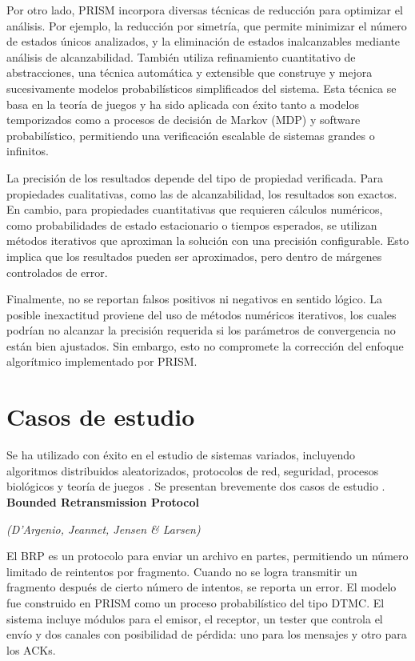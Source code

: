 \documentclass[runningheads]{llncs}
\begin{document}
Por otro lado, PRISM incorpora diversas técnicas de reducción para optimizar el análisis. Por ejemplo, la reducción por simetría, que permite minimizar el número de estados únicos analizados, y la eliminación de estados inalcanzables mediante análisis de alcanzabilidad. También utiliza refinamiento cuantitativo de abstracciones, una técnica automática y extensible que construye y mejora sucesivamente modelos probabilísticos simplificados del sistema. Esta técnica se basa en la teoría de juegos y ha sido aplicada con éxito tanto a modelos temporizados como a procesos de decisión de Markov (MDP) y software probabilístico, permitiendo una verificación escalable de sistemas grandes o infinitos.

La precisión de los resultados depende del tipo de propiedad verificada. Para propiedades cualitativas, como las de alcanzabilidad, los resultados son exactos. En cambio, para propiedades cuantitativas que requieren cálculos numéricos, como probabilidades de estado estacionario o tiempos esperados, se utilizan métodos iterativos que aproximan la solución con una precisión configurable. Esto implica que los resultados pueden ser aproximados, pero dentro de márgenes controlados de error.

Finalmente, no se reportan falsos positivos ni negativos en sentido lógico. La posible inexactitud proviene del uso de métodos numéricos iterativos, los cuales podrían no alcanzar la precisión requerida si los parámetros de convergencia no están bien ajustados. Sin embargo, esto no compromete la corrección del enfoque algorítmico implementado por PRISM.

\section{Casos de estudio}

Se ha utilizado con éxito en el estudio de sistemas variados, incluyendo algoritmos distribuidos aleatorizados, protocolos de red, seguridad, procesos biológicos y teoría de juegos \cite{PRISMCaseStudies}. Se presentan brevemente dos casos de estudio \cite{PRISMBRP}\cite{PRISMFairExchange}.\\

\textbf{Bounded Retransmission Protocol}

\textit{(D'Argenio, Jeannet, Jensen \& Larsen)}

El BRP es un protocolo para enviar un archivo en partes, permitiendo un número limitado de reintentos por fragmento. Cuando no se logra transmitir un fragmento después de cierto número de intentos, se reporta un error. El modelo fue construido en PRISM como un proceso probabilístico del tipo DTMC. El sistema incluye módulos para el emisor, el receptor, un tester que controla el envío y dos canales con posibilidad de pérdida: uno para los mensajes y otro para los ACKs.
\end{document}
